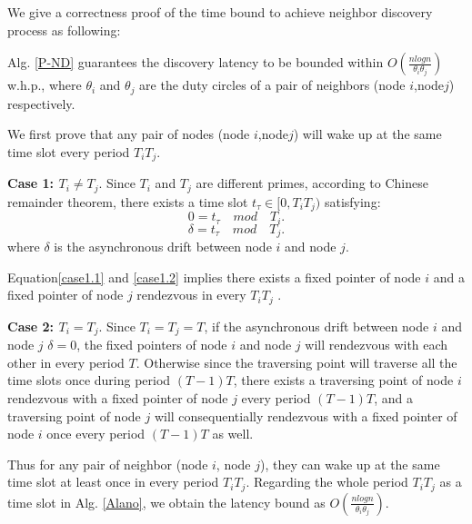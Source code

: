 We give a correctness proof of the time 
bound to achieve neighbor discovery process as following:


\begin{theorem}
\label{PBND1}
Alg. \ref{P-ND} guarantees the discovery latency
to be bounded within $O(\frac{nlogn}{\theta_i\theta_j})$ w.h.p.,
where $\theta_i$ and $\theta_j$ are the duty circles of 
a pair of neighbors (node $i$,node$j$) respectively.
\end{theorem}



\begin{IEEEproof}
We first prove that any pair of nodes (node $i$,node$j$) will wake up 
at the same time slot every period $T_iT_j$.

\textbf{Case 1: $T_i \neq T_j$}. Since $T_i$ and $T_j$ are different primes, 
according to Chinese remainder theorem, there exists a time slot $t_\tau \in \lbrack 0,T_iT_j ) $ satisfying:
\begin{equation}
\label{case1.1}
0 = t_\tau  \quad mod \quad  T_i.
\end{equation}
\begin{equation}
\label{case1.2}
\delta = t_\tau  \quad mod \quad  T_j.
\end{equation}
where $\delta$ is the asynchronous drift between node $i$ and node $j$.

Equation\ref{case1.1} and \ref{case1.2}  implies there exists a fixed pointer of node $i$ 
and a fixed pointer of node $j$ rendezvous in every $T_iT_j$  .

\textbf{Case 2: $T_i = T_j$}. Since $T_i = T_j = T$, if the asynchronous drift between 
node $i$ and node $j$ $\delta = 0$, the fixed pointers of node $i$ and node $j$ will 
rendezvous with each other in every period $T$.
Otherwise since the traversing point will traverse all the time slots once during period $(T-1)T$,
there exists a traversing point of node $i$ rendezvous with a fixed pointer
of node $j$ every period $(T-1)T$, and a traversing point of node $j$ 
will consequentially rendezvous with a fixed pointer
of node $i$ once every period $(T-1)T$ as well.

Thus for any pair of neighbor (node $i$, node $j$), they can wake up
at the same time slot at least once in every period $T_iT_j$. Regarding 
the whole period $T_iT_j$ as a time slot in Alg. \ref{Alano}, we obtain the latency 
bound as $O(\frac{nlogn}{\theta_i\theta_j})$.
\end{IEEEproof}




